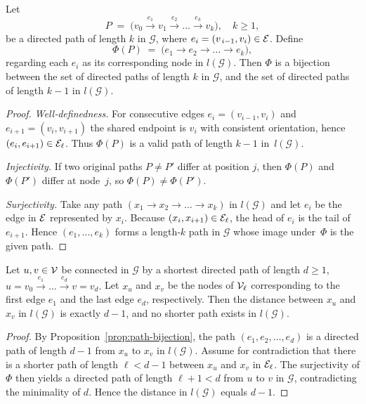 \vspace{4pt}
\begin{proposition}
\label{prop:path-bijection}
Let
\[
P \;=\;
\bigl(
  v_0 \xrightarrow{\,e_1\,} v_1 \xrightarrow{\,e_2\,} \dots
  \xrightarrow{\,e_k\,} v_k
\bigr),\quad k\ge 1,
\]
be a directed path of length $k$ in $\mathcal{G}$, where
$e_i=(v_{\,i-1},v_i)\in\mathcal{E}$.
Define
\[
\Phi(P)
\;=\;
\bigl(e_1 \xrightarrow{} e_2 \xrightarrow{}\dots\xrightarrow{} e_k\bigr),
\]
regarding each $e_i$ as its corresponding node in $l(\mathcal{G})$.
Then $\Phi$ is a bijection between the set of directed paths of length $k$ in $\mathcal{G}$, and
the set of directed paths of length $k-1$ in $l(\mathcal{G})$.
\end{proposition}

\begin{proof}
\emph{Well‑definedness.}  
For consecutive edges $e_i=(v_{i-1},v_i)$ and $e_{i+1}=(v_i,v_{i+1})$
the shared endpoint is $v_i$ with consistent orientation, hence
$(e_i,e_{i+1})\in\mathcal{E}_{\ell}$.
Thus $\Phi(P)$ is a valid path of length $k-1$ in~$l(\mathcal{G})$.

\emph{Injectivity.}  
If two original paths $P\neq P'$ differ at position $j$, then
$\Phi(P)$ and $\Phi(P')$ differ at node~$j$, so $\Phi(P)\neq\Phi(P')$.

\emph{Surjectivity.}  
Take any path $(x_1\!\to x_2\!\to\dots\to x_k)$ in $l(\mathcal{G})$ and
let $e_i$ be the edge in $\mathcal{E}$ represented by $x_i$.
Because $(x_i,x_{i+1})\in\mathcal{E}_{\ell}$, the head of $e_i$ is the tail
of $e_{i+1}$.  Hence $(e_1,\dots,e_k)$ forms a length‑$k$ path in
$\mathcal{G}$ whose image under~$\Phi$ is the given path.
\end{proof}

\vspace{4pt}
\begin{proposition}
\label{prop:length-reduction}
Let $u,v\in\mathcal{V}$ be connected in $\mathcal{G}$ by a shortest
directed path of length $d\ge 1$,
\(
u=v_0\!\xrightarrow{e_1}\!\dots\xrightarrow{e_d} v=v_d.
\)
Let $x_u$ and $x_v$ be the nodes of $\mathcal{V}_{\ell}$ corresponding to
the first edge $e_1$ and the last edge $e_d$, respectively.
Then the distance between $x_u$ and $x_v$ in $l(\mathcal{G})$ is
exactly $d-1$, and no shorter path exists in $l(\mathcal{G})$.
\end{proposition}

\begin{proof}
By Proposition~\ref{prop:path-bijection}, the path
$(e_1,e_2,\dots,e_d)$ is a directed path of length $d-1$ from
$x_u$ to $x_v$ in $l(\mathcal{G})$.
Assume for contradiction that there is a shorter path of length
$\ell<d-1$ between $x_u$ and $x_v$ in $\mathcal{E}_{\ell}$.
The surjectivity of $\Phi$ then yields a directed path of length
$\ell+1<d$ from $u$ to $v$ in $\mathcal{G}$, contradicting the
minimality of $d$.
Hence the distance in $l(\mathcal{G})$ equals $d-1$.
\end{proof}

